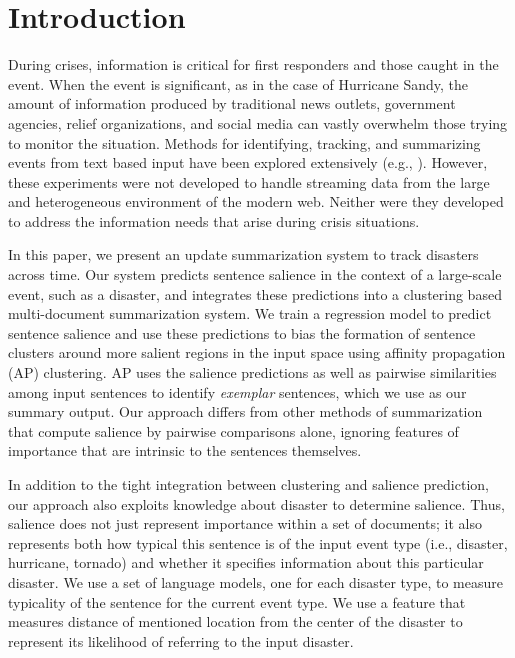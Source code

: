 \section{Introduction}
\label{sec:introduction}
During crises, information is critical for first responders and those caught
in the event.  When the event is significant, as in the case of Hurricane
Sandy, the amount of information produced by traditional news outlets,
government agencies, relief organizations, and social media can vastly
overwhelm those trying to monitor the situation. Methods for identifying,
tracking, and summarizing events from text based input have been explored
extensively
(e.g.,
\cite{allan1998topic,Filatova&Hatzivassiloglou.04a,Wang&al.11}). However,
these experiments were not developed to handle streaming data from  the large and heterogeneous
environment of the modern web. Neither were they developed to address the
information needs that arise during  crisis
situations. 

In this paper, we present an update summarization system to track disasters
across time. Our system predicts sentence salience in the context of a
large-scale event, such as a disaster,  and integrates these predictions into
a clustering based multi-document summarization system. We train a regression
model to predict sentence salience and use these predictions to bias the
formation of sentence clusters around more salient regions in the input space
using affinity propagation (AP) clustering.  AP uses the salience predictions
as well as pairwise similarities among input sentences to identify
\emph{exemplar} sentences, which we use as our summary output.  Our approach
differs from other methods of summarization that compute salience by pairwise
comparisons alone, ignoring features of importance that are intrinsic to the
sentences themselves.


In addition to the tight integration between clustering and salience
prediction, our approach also exploits knowledge about disaster to determine
salience. Thus, salience does not just represent importance within a set of
documents; it also represents both how typical this sentence is of the input event
type (i.e., disaster, hurricane, tornado) and whether it specifies information
about this particular disaster. We use a set of language models, one for each
disaster type, to measure typicality of the sentence for the current event type. We
use a feature that measures distance of mentioned location from the center of
the disaster to represent its likelihood of referring to the input disaster. 





